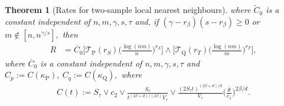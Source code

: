 \documentclass[10pt,a4paper]{amsart}
\newtheorem{theorem}{Theorem}
\renewcommand{\P}{\operatorname{P}}
\newcommand{\Q}{\operatorname{Q}}
\renewcommand{\k}{\kappa}
\newcommand{\mT}{\mathcal{T}}
\newcommand{\ol}{\overline}
\begin{document}
\begin{theorem}[Rates for two-sample local nearest neighbours]
    where $\tilde C_0$ is a constant independent of $n,m, \gamma, s, \tau$ and, if $(\gamma - r_\beta)(s - r_\beta) \geq 0$ or $m \notin [n, n^{\gamma/s}],$ then
    \begin{align*}
         R &= \ol C_0\Big[\mT_{\P}(r_S)\Big(\frac{\log(nm)}{n}\Big)^{r_S}\Big]\wedge \Big[\mT_{\Q}(r_T)\Big(\frac{\log(nm)}{m}\Big)^{r_T}\Big],
    \end{align*}
    where $\ol C_0$ is a constant independent of $n,m, \gamma, s, \tau$ and $C_p := C(\k_{\P}), \ C_q := C(\k_{\Q}),$ where
    \begin{align*}
        C(t) := S_\tau\vee c_2 \vee \frac{S_\tau}{t^{(2\beta + d)/(2\beta)}V_\tau} \vee \frac{(2S_\tau t)^{(2\beta + d)/d}}{V_\tau}\bigg(\frac{\theta}{c_1}\bigg)^{2\beta/d}.
    \end{align*}
    
\end{theorem}
\end{document}
